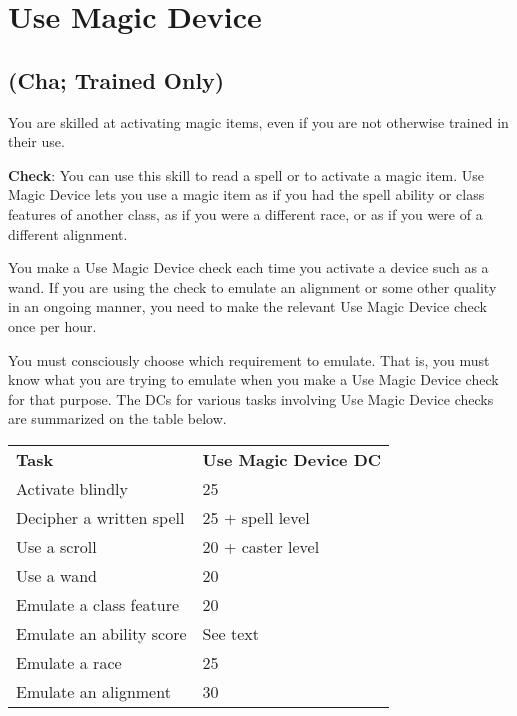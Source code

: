 \section{Use Magic Device}

\label{f0}				
\subsection{(Cha; Trained Only)}

				
You are skilled at activating magic items, even if you are not otherwise trained in their use.
				
\textbf{Check}: You can use this skill to read a spell or to activate a magic item. Use Magic Device lets you use a magic item as if you had the spell ability or class features of another class, as if you were a different race, or as if you were of a different alignment.
				
You make a Use Magic Device check each time you activate a device such as a wand. If you are using the check to emulate an alignment or some other quality in an ongoing manner, you need to make the relevant Use Magic Device check once per hour.
				
You must consciously choose which requirement to emulate. That is, you must know what you are trying to emulate when you make a Use Magic Device check for that purpose. The DCs for various tasks involving Use Magic Device checks are summarized on the table below.

\begin{table}
 \sffamily
 \begin{tabular}{ll}
\textbf{Task} & \textbf{Use Magic Device DC}\\
Activate blindly & 25\\
Decipher a written spell & 25 + spell level\\
Use a scroll & 20 + caster level\\
Use a wand & 20\\
Emulate a class feature & 20\\
Emulate an ability score & See text\\
Emulate a race & 25\\
Emulate an alignment & 30\\  
 \end{tabular}

\end{table}
			
